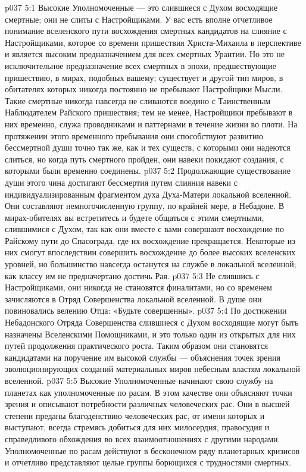 \vs p037 5:1 Высокие Уполномоченные --- это слившиеся с Духом восходящие смертные; они не слиты с Настройщиками. У вас есть вполне отчетливое понимание вселенского пути восхождения смертных кандидатов на слияние с Настройщиками, которое со времени пришествия Христа\hyp{}Михаила в перспективе и является высоким предназначением для всех смертных Урантии. Но это не исключительное предназначение всех смертных в эпохи, предшествующие пришествию, в мирах, подобных вашему; существует и другой тип миров, в обитателях которых никогда постоянно не пребывают Настройщики Мысли. Такие смертные никогда навсегда не сливаются воедино с Таинственным Наблюдателем Райского пришествия; тем не менее, Настройщики пребывают в них временно, служа проводниками и паттернами в течение жизни во плоти. На протяжении этого временного пребывания они способствуют развитию бессмертной души точно так же, как и тех существ, с которыми они надеются слиться, но когда путь смертного пройден, они навеки покидают создания, с которыми были временно соединены.
\vs p037 5:2 Продолжающие существование души этого чина достигают бессмертия путем слияния навеки с индивидуализированным фрагментом духа Духа\hyp{}Матери локальной вселенной. Они составляют немногочисленную группу, по крайней мере, в Небадоне. В мирах\hyp{}обителях вы встретитесь и будете общаться с этими смертными, слившимися с Духом, так как они вместе с вами совершают восхождение по Райскому пути до Спасограда, где их восхождение прекращается. Некоторые из них смогут впоследствии совершить восхождение до более высоких вселенских уровней, но большинство навсегда останутся на службе в локальной вселенной; как классу им не предначертано достичь Рая.
\vs p037 5:3 Не слившись с Настройщиками, они никогда не становятся финалитами, но со временем зачисляются в Отряд Совершенства локальной вселенной. В душе они повиновались велению Отца: «Будьте совершенны».
\vs p037 5:4 \pc По достижении Небадонского Отряда Совершенства слившиеся с Духом восходящие могут быть назначены Вселенскими Помощниками, и это только один из открытых для них путей продолжения практического роста. Таким образом они становятся кандидатами на поручение им высокой службы --- объяснения точек зрения эволюционирующих созданий материальных миров небесным властям локальной вселенной.
\vs p037 5:5 Высокие Уполномоченные начинают свою службу на планетах как уполномоченные по расам. В этом качестве они объясняют точки зрения и описывают потребности различных человеческих рас. Они в высшей степени преданы благоденствию человеческих рас, от имени которых и выступают, всегда стремясь добиться для них милосердия, правосудия и справедливого обхождения во всех взаимоотношениях с другими народами. Уполномоченные по расам действуют в бесконечном ряду планетарных кризисов и отчетливо представляют целые группы борющихся с трудностями смертных.
